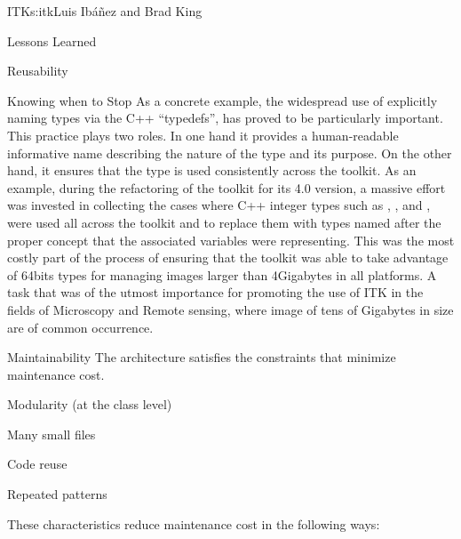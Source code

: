 \begin{aosachapter}{ITK}{s:itk}{Luis Ib\'{a}\~{n}ez and Brad King}
\begin{aosasect1}{Lessons Learned}
\begin{aosasect2}{Reusability}
\begin{aosasect3}{Knowing when to Stop}
As a concrete example, the widespread use of explicitly naming types via the C++
``typedefs'', has proved to be particularly important. This practice plays two
roles. In one hand it provides a human-readable informative name describing the
nature of the type and its purpose. On the other hand, it ensures that the type
is used consistently across the toolkit. As an example, during the refactoring
of the toolkit for its 4.0 version, a massive effort was invested in collecting
the cases where C++ integer types such as , ,
 and , were used all across the toolkit and to
replace them with types named after the proper concept that the associated
variables were representing. This was the most costly part of the process of
ensuring that the toolkit was able to take advantage of 64bits types for
managing images larger than 4Gigabytes in all platforms. A task that was of the
utmost importance for promoting the use of ITK in the fields of Microscopy and
Remote sensing, where image of tens of Gigabytes in size are of common
occurrence.
\end{aosasect3}

\end{aosasect2}

\begin{aosasect2}{Maintainability}
The architecture satisfies the constraints that minimize maintenance cost.
\begin{aosaitemize}
\item Modularity (at the class level)
\item Many small files
\item Code reuse
\item Repeated patterns
\end{aosaitemize}
\end{aosasect2}

These characteristics reduce maintenance cost in the following ways:


\end{aosasect1}
\end{aosachapter}
